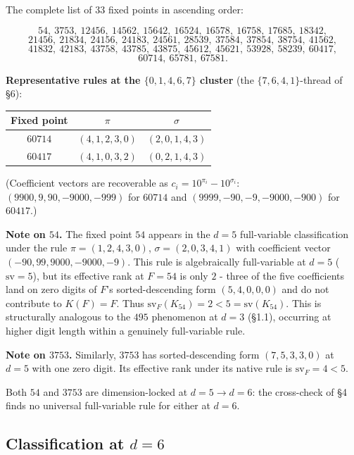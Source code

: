 \documentclass[11pt,letterpaper]{article}
\theoremstyle{paperstyle}
\theoremstyle{paperstyledef}
\theoremstyle{paperstylerem}
\begin{document}
The complete list of \(33\) fixed points in ascending order:

\[54,\ 3753,\ 12456,\ 14562,\ 15642,\ 16524,\ 16578,\ 16758,\ 17685,\ 18342,\]
\[21456,\ 21834,\ 24156,\ 24183,\ 24561,\ 28539,\ 37584,\ 37854,\ 38754,\ 41562,\]
\[41832,\ 42183,\ 43758,\ 43785,\ 43875,\ 45612,\ 45621,\ 53928,\ 58239,\ 60417,\]
\[60714,\ 65781,\ 67581.\]

\textbf{Representative rules at the \(\{0, 1, 4, 6, 7\}\) cluster} (the
\(\{7, 6, 4, 1\}\)-thread of §6):

\begin{longtable}[]{@{}ccc@{}}
\toprule\noalign{}
Fixed point & \(\pi\) & \(\sigma\) \\
\midrule\noalign{}
\endhead
\bottomrule\noalign{}
\endlastfoot
\(60714\) & \((4, 1, 2, 3, 0)\) & \((2, 0, 1, 4, 3)\) \\
\(60417\) & \((4, 1, 0, 3, 2)\) & \((0, 2, 1, 4, 3)\) \\
\end{longtable}

(Coefficient vectors are recoverable as
\(c_i = 10^{\pi_i} - 10^{\sigma_i}\): \((9900, 9, 90, -9000, -999)\) for
\(60714\) and \((9999, -90, -9, -9000, -900)\) for \(60417\).)

\textbf{Note on \(54\).} The fixed point \(54\) appears in the \(d = 5\)
full-variable classification under the rule \(\pi = (1, 2, 4, 3, 0)\),
\(\sigma = (2, 0, 3, 4, 1)\) with coefficient vector
\((-90, 99, 9000, -9000, -9)\). This rule is algebraically full-variable
at \(d = 5\) (\(\mathrm{sv} = 5\)), but its effective rank at \(F = 54\)
is only \(2\) - three of the five coefficients land on zero digits of
\(F\)'s sorted-descending form \((5, 4, 0, 0, 0)\) and do not contribute
to \(K(F) = F\). Thus
\(\mathrm{sv}_F(K_{54}) = 2 < 5 = \mathrm{sv}(K_{54})\). This is
structurally analogous to the \(495\) phenomenon at \(d = 3\) (§1.1),
occurring at higher digit length within a genuinely full-variable rule.

\textbf{Note on \(3753\).} Similarly, \(3753\) has sorted-descending
form \((7, 5, 3, 3, 0)\) at \(d = 5\) with one zero digit. Its effective
rank under its native rule is \(\mathrm{sv}_F = 4 < 5\).

Both \(54\) and \(3753\) are dimension-locked at \(d = 5 \to d = 6\):
the cross-check of §4 finds no universal full-variable rule for either
at \(d = 6\).

\hypertarget{a.4-classification-at-d-6}{%
\subsection{\texorpdfstring{Classification at \(d = 6\)}{Classification at d = 6}}\label{a.4-classification-at-d-6}}
\end{document}
